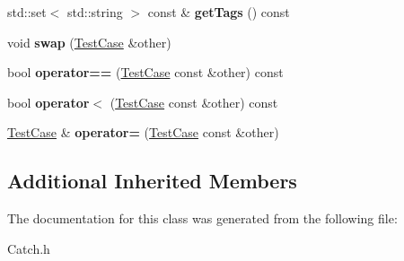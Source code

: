 \begin{DoxyCompactItemize}
\item 
\hypertarget{class_catch_1_1_test_case_aa4313341335b9a9ebbe4682c0d808b32}{std\-::set$<$ std\-::string $>$ const \& {\bfseries get\-Tags} () const }\label{class_catch_1_1_test_case_aa4313341335b9a9ebbe4682c0d808b32}

\item 
\hypertarget{class_catch_1_1_test_case_aee38f908faf10b905b209ca388275413}{void {\bfseries swap} (\hyperlink{class_catch_1_1_test_case}{Test\-Case} \&other)}\label{class_catch_1_1_test_case_aee38f908faf10b905b209ca388275413}

\item 
\hypertarget{class_catch_1_1_test_case_a40eab521b316c7d476f6b4dd1c33eec8}{bool {\bfseries operator==} (\hyperlink{class_catch_1_1_test_case}{Test\-Case} const \&other) const }\label{class_catch_1_1_test_case_a40eab521b316c7d476f6b4dd1c33eec8}

\item 
\hypertarget{class_catch_1_1_test_case_aa5174e85e3aac6e7398dee9c76730324}{bool {\bfseries operator$<$} (\hyperlink{class_catch_1_1_test_case}{Test\-Case} const \&other) const }\label{class_catch_1_1_test_case_aa5174e85e3aac6e7398dee9c76730324}

\item 
\hypertarget{class_catch_1_1_test_case_a8022e3f74232f7887d2d2cbbc8876502}{\hyperlink{class_catch_1_1_test_case}{Test\-Case} \& {\bfseries operator=} (\hyperlink{class_catch_1_1_test_case}{Test\-Case} const \&other)}\label{class_catch_1_1_test_case_a8022e3f74232f7887d2d2cbbc8876502}

\end{DoxyCompactItemize}
\subsection*{Additional Inherited Members}


The documentation for this class was generated from the following file\-:\begin{DoxyCompactItemize}
\item 
Catch.\-h\end{DoxyCompactItemize}
